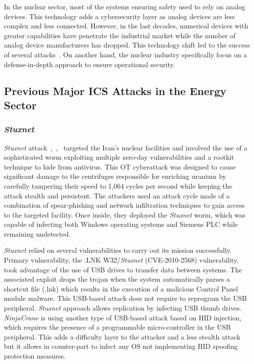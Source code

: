 In the nuclear sector, most of the systems ensuring safety used to rely on analog devices. This technology adds a cybersecurity layer as analog devices are less complex and less connected. However, in the last decades, numerical devices with greater capabilities have penetrate the industrial market while the number of analog device manufacturers has dropped. This technology shift led to the success of several attacks~\cite{Drias15}. On another hand, the nuclear industry specifically focus on a defense-in-depth approach to ensure operational security.  

\subsection{Previous Major ICS Attacks in the Energy Sector}

\subsubsection{\emph{Stuxnet}}

\emph{Stuxnet} attack~\cite{stuxnetcode15},~\cite{Kushner13},~\cite{stuxnetdossier10} targeted the Iran's nuclear facilities and involved the use of a sophisticated worm exploiting multiple zero-day vulnerabilities and a rootkit technique to hide from antivirus. This OT cyberattack was designed to cause significant damage to the centrifuges responsible for enriching uranium by carefully tampering their speed to 1,064 cycles per second while keeping the attack stealth and persistent. The attackers used an attack cycle made of a combination of spear-phishing and network infiltration techniques to gain access to the targeted facility. Once inside, they deployed the \emph{Stuxnet} worm, which was capable of infecting both Windows operating systems and Siemens PLC while remaining undetected. 

\emph{Stuxnet} relied on several vulnerabilities to carry out its mission successfully. Primary vulnerability, the .LNK W32/\emph{Stuxnet} (CVE-2010-2568) vulnerability, took advantage of the use of USB drives to transfer data between systems. The associated exploit drops the trojan when the system automatically parses a shortcut file (.lnk)  which results in the execution of a malicious Control Panel module malware. This USB-based attack does not require to reprogram the USB peripheral. \emph{Stuxnet} approach allows replication by infecting USB thumb drives. \emph{NinjaCrane} is using another type of USB-based attack based on HID injection, which requires the presence of a programmable micro-controller in the USB peripheral. This adds a difficulty layer to the attacker and a less stealth attack but it allows in counter-part to infect any OS not implementing HID spoofing protection measures.

